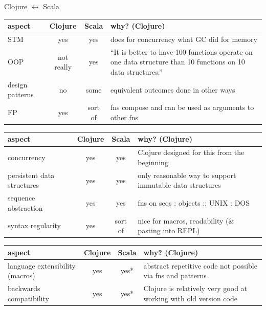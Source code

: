 \documentclass{beamer}
\begin{document}
\begin{frame}[allowframebreaks]{Clojure $\leftrightarrow$ Scala}
  \begin{tabularx}{\linewidth}{l || c | c | X}
    aspect & Clojure & Scala & why? (Clojure)\\
    \hline
    \hline
    STM & yes & yes & does for concurrency what GC did for memory\\
    \hline
    OOP & not really & yes & ``It is better to have 100 functions
    operate on one data structure than 10 functions on 10 data
    structures.''\\
    \hline
    design patterns & no & some & equivalent outcomes done in other
    ways\\
    \hline
    FP & yes & sort of & fns compose and can be used as arguments to
    other fns\\
  \end{tabularx}

  \framebreak
  \begin{tabularx}{\linewidth}{X || c | c | X}
    aspect & Clojure & Scala & why? (Clojure)\\
    \hline
    \hline
    concurrency & yes & yes & Clojure designed for this from the
    beginning\\
    \hline
    persistent data structures & yes & yes & only reasonable way to
    support immutable data structures\\
    \hline
    sequence abstraction & yes & yes & fns on seqs : objects :: UNIX :
    DOS\\
    \hline
    syntax regularity & yes & sort of & nice for macros, readability
    (\& pasting into REPL)\\
    \hline
  \end{tabularx}

  \framebreak
  \begin{tabularx}{\linewidth}{X || c | c | X}
    aspect & Clojure & Scala & why? (Clojure)\\
    \hline
    \hline
    language extensibility (macros) & yes & yes* & abstract repetitive
    code not possible via fns and patterns\\
    \hline
    backwards compatibility & yes & yes* & Clojure is relatively very
    good at working with old version code\\
  \end{tabularx}
\end{frame}
\end{document}
